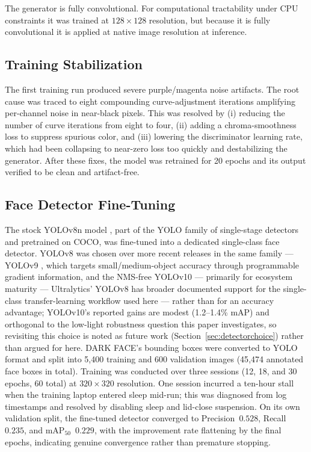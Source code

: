 \documentclass[conference]{IEEEtran}
\begin{document}
The generator is fully convolutional. For computational
tractability under CPU constraints it was trained at
$128\times128$ resolution, but because it is fully convolutional
it is applied at native image resolution at inference.

\subsection{Training Stabilization}
\label{sec:trainstab}
The first training run produced severe purple/magenta noise
artifacts. The root cause was traced to eight compounding
curve-adjustment iterations amplifying per-channel noise in
near-black pixels. This was resolved by (i) reducing the number
of curve iterations from eight to four, (ii) adding a
chroma-smoothness loss to suppress spurious color, and (iii)
lowering the discriminator learning rate, which had been
collapsing to near-zero loss too quickly and destabilizing the
generator. After these fixes, the model was retrained for 20
epochs and its output verified to be clean and artifact-free.

\subsection{Face Detector Fine-Tuning}
\label{sec:detectorfinetuning}
The stock YOLOv8n model \cite{yolov8}, part of the YOLO family
of single-stage detectors \cite{redmon2016} and pretrained on
COCO, was fine-tuned into a dedicated single-class face
detector. YOLOv8 was chosen over more recent releases in the same family
--- YOLOv9 \cite{yolov9}, which targets small/medium-object
accuracy through programmable gradient information, and the
NMS-free YOLOv10 \cite{yolov10} --- primarily for ecosystem
maturity ---
Ultralytics' YOLOv8 has broader documented support for the
single-class transfer-learning workflow used here --- rather
than for an accuracy advantage; YOLOv10's reported gains are
modest (1.2--1.4\% mAP) and orthogonal to the low-light
robustness question this paper investigates, so revisiting this
choice is noted as future work
(Section~\ref{sec:detectorchoice}) rather than argued for here.
DARK FACE's bounding
boxes were converted to YOLO format and split into 5{,}400
training and 600 validation images (45{,}474 annotated face
boxes in total). Training was conducted over three sessions
(12, 18, and 30 epochs, 60 total) at $320\times320$ resolution.
One session incurred a ten-hour stall when the training laptop
entered sleep mid-run; this was diagnosed from log timestamps and
resolved by disabling sleep and lid-close suspension. On its own
validation split, the fine-tuned detector converged to
Precision~$0.528$, Recall~$0.235$, and mAP$_{50}$~$0.229$, with
the improvement rate flattening by the final epochs, indicating
genuine convergence rather than premature stopping.
\end{document}
